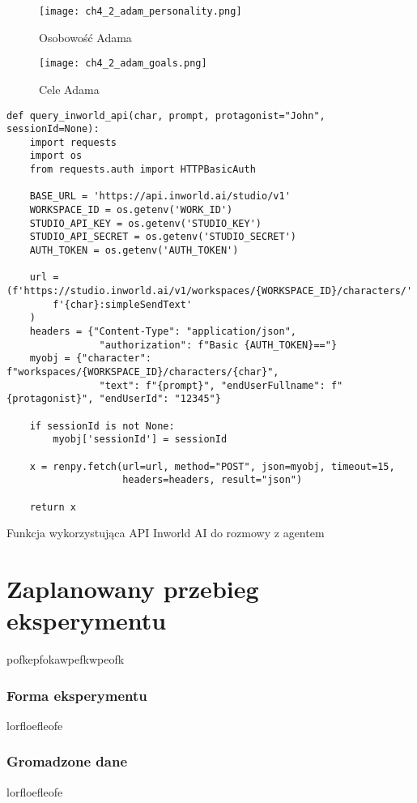 \lipsum[1]

\begin{figure}[h!]
    \centering
    \texttt{[image: ch4\_2\_adam\_personality.png]}
    \caption{Osobowość Adama}
    \label{fig:ch4_2_adam_personality}
\end{figure}

\lipsum[1]

\begin{figure}[h!]
    \centering
    \texttt{[image: ch4\_2\_adam\_goals.png]}
    \caption{Cele Adama}
    \label{fig:ch4_2_adam_goals}
\end{figure}

\lipsum[1]

\begin{listing}
    \begin{verbatim}  
def query_inworld_api(char, prompt, protagonist="John", sessionId=None):
    import requests
    import os
    from requests.auth import HTTPBasicAuth

    BASE_URL = 'https://api.inworld.ai/studio/v1'
    WORKSPACE_ID = os.getenv('WORK_ID')
    STUDIO_API_KEY = os.getenv('STUDIO_KEY')
    STUDIO_API_SECRET = os.getenv('STUDIO_SECRET')
    AUTH_TOKEN = os.getenv('AUTH_TOKEN')

    url = (f'https://studio.inworld.ai/v1/workspaces/{WORKSPACE_ID}/characters/'
        f'{char}:simpleSendText'
    )
    headers = {"Content-Type": "application/json",
                "authorization": f"Basic {AUTH_TOKEN}=="}
    myobj = {"character": f"workspaces/{WORKSPACE_ID}/characters/{char}",
                "text": f"{prompt}", "endUserFullname": f"{protagonist}", "endUserId": "12345"}

    if sessionId is not None:
        myobj['sessionId'] = sessionId

    x = renpy.fetch(url=url, method="POST", json=myobj, timeout=15,
                    headers=headers, result="json")

    return x
\end{verbatim}
    \caption{Funkcja wykorzystująca API Inworld AI do rozmowy z agentem} \label{listing:myListing}
\end{listing}

\lipsum[1]

\section{Zaplanowany przebieg eksperymentu}\label{section:ch4_3}

pofkepfokawpefkwpeofk

\subsubsection*{Forma eksperymentu}

lorfloefleofe

\subsubsection*{Gromadzone dane}

lorfloefleofe